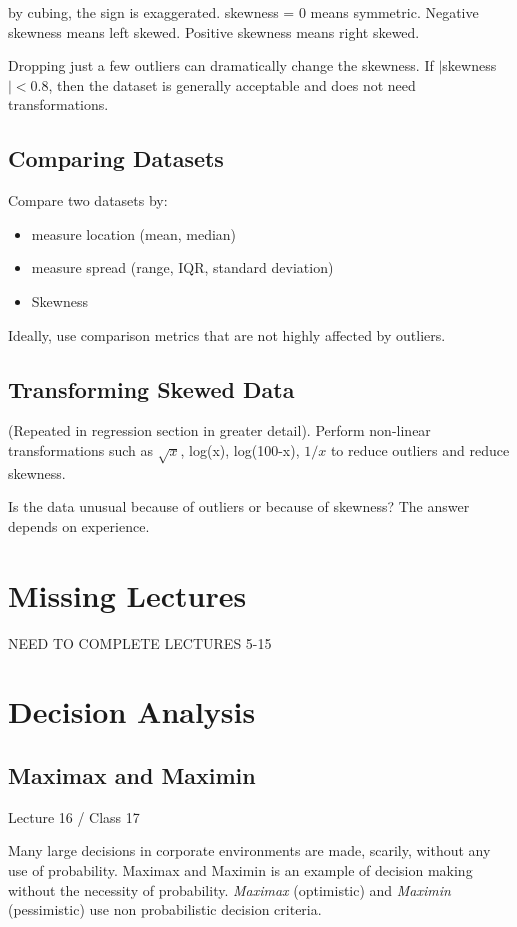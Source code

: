 \documentclass[11pt, oneside]{article}   	%
\begin{document}
by cubing, the sign is exaggerated. skewness = 0 means symmetric. Negative skewness means left skewed. Positive skewness means right skewed.

Dropping just a few outliers can dramatically change the skewness. If $|$skewness$|  < 0.8$, then the dataset is generally acceptable and does not need transformations.

\subsection{Comparing Datasets}

Compare two datasets by:
\begin{itemize}
\item{measure location (mean, median)}
\item{measure spread (range, IQR, standard deviation)}
\item{Skewness}
\end{itemize}

Ideally, use comparison metrics that are not highly affected by outliers.

\subsection{Transforming Skewed Data}

(Repeated in regression section in greater detail). Perform non-linear transformations such as $\sqrt{x}$, log(x), log(100-x), $1/x$ to reduce outliers and reduce skewness.

Is the data unusual because of outliers or because of skewness? The answer depends on experience.

\section{Missing Lectures}
NEED TO COMPLETE LECTURES 5-15


\section{Decision Analysis}

\subsection{Maximax and Maximin}
Lecture 16 / Class 17

Many large decisions in corporate environments are made, scarily, without any use of probability. Maximax and Maximin is an example of decision making without the necessity of probability. 
\textit{Maximax} (optimistic) and \textit{Maximin} (pessimistic)  use non probabilistic decision criteria. 
\end{document}
